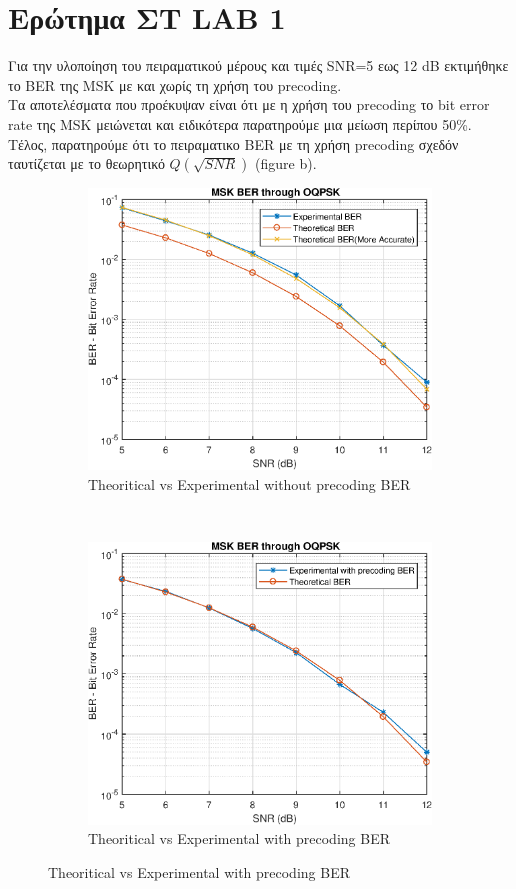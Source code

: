 \documentclass{article}
\begin{document}
\section{Eρώτημα ΣΤ LAB 1}
Για την υλοποίηση του πειραματικού μέρους και τιμές SNR=5 εως 12 dB εκτιμήθηκε το BER της MSK με και χωρίς τη χρήση του precoding.\\
Tα αποτελέσματα που προέκυψαν είναι ότι με η χρήση του precoding το bit error rate της MSK μειώνεται και ειδικότερα παρατηρούμε μια μείωση περίπου 50\%.\\
Τέλος, παρατηρούμε ότι το πειραματικο BER με τη χρήση precoding σχεδόν ταυτίζεται με το θεωρητικό $Q(\sqrt{SNR})$ (figure b).
\pagebreak
\begin{figure}[h!]
	\centering
	\begin{subfigure}[t]{0.5\textwidth}
		\centering
		\includegraphics[width=\linewidth]{./results/epsFig}
		\caption{Theoritical vs Experimental without precoding BER}
	\end{subfigure}%
	~
	\begin{subfigure}[t]{0.5\textwidth}
		\centering
		\includegraphics[width=\linewidth]{./results/epsFig1}
		\caption{Theoritical vs Experimental with precoding BER}
	\end{subfigure}
\end{figure}
\end{document}
